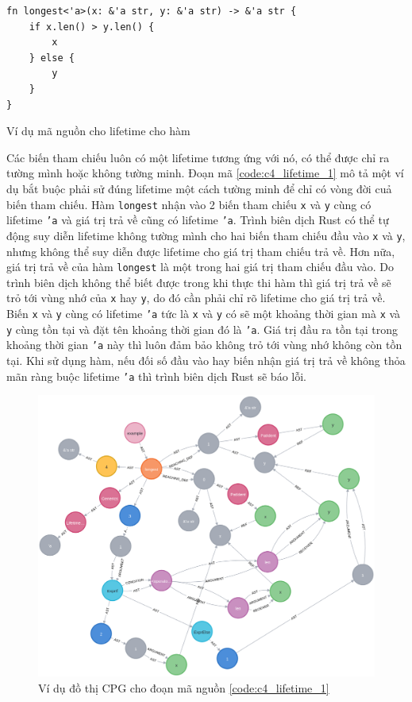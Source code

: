 \begin{listing}[H]
\begin{verbatim}
fn longest<'a>(x: &'a str, y: &'a str) -> &'a str {
    if x.len() > y.len() {
        x
    } else {
        y
    }
}
\end{verbatim}
\caption{Ví dụ mã nguồn cho lifetime cho hàm}
\label{code:c4_lifetime_1}
\end{listing}

Các biến tham chiếu luôn có một lifetime tương ứng với nó, có thể được chỉ ra tường mình hoặc không tường minh.
Đoạn mã \ref{code:c4_lifetime_1} mô tả một ví dụ bắt buộc phải sử đúng lifetime một cách tường minh để chỉ có vòng đời cuả biến tham chiếu.
Hàm \texttt{longest} nhận vào 2 biến tham chiếu \texttt{x} và \texttt{y} cùng có lifetime \texttt{'a} và giá trị trả về cũng có lifetime \texttt{'a}.
Trình biên dịch Rust có thể tự động suy diễn lifetime không tường mình cho hai biến tham chiếu đầu vào \texttt{x} và \texttt{y}, nhưng không thể suy diễn được lifetime cho giá trị tham chiếu trả về.
Hơn nữa, giá trị trả về của hàm \texttt{longest} là một trong hai giá trị tham chiếu đầu vào.
Do trình biên dịch không thể biết được trong khi thực thi hàm thì giá trị trả về sẽ trỏ tới vùng nhớ của \texttt{x} hay \texttt{y}, do đó cần phải chỉ rõ lifetime cho giá trị trả về.
Biến \texttt{x} và \texttt{y} cùng có lifetime \texttt{'a} tức là \texttt{x} và \texttt{y} có sẽ một khoảng thời gian mà \texttt{x} và \texttt{y} cùng tồn tại và đặt tên khoảng thời gian đó là \texttt{'a}.
Giá trị đầu ra tồn tại trong khoảng thời gian \texttt{'a} này thì luôn đảm bảo không trỏ tới vùng nhớ không còn tồn tại.
Khi sử dụng hàm, nếu đối số đầu vào hay biến nhận giá trị trả về không thỏa mãn ràng buộc lifetime \texttt{'a} thì trình biên dịch Rust sẽ báo lỗi.

\begin{figure}[H]
    \includegraphics[width=1\columnwidth]{figures/c4/c4_lifetime_1.png}
    \centering
    \caption{Ví dụ đồ thị CPG cho đoạn mã nguồn \ref{code:c4_lifetime_1}}
    \label{img:c4_lifetime_1}
\end{figure}

